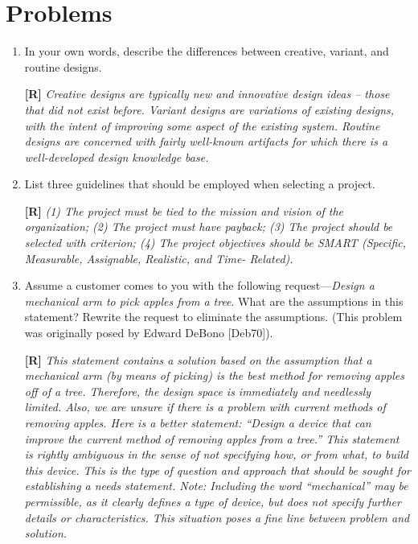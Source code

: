 \section{Problems}
\label{section:projectSelectionProblems}


\begin{enumerate}
\def\labelenumi{\arabic{enumi}.}
\item
  In your own words, describe the differences between creative, variant,
  and routine designs.
 \begin{onlysolution}
 \textbf{[R]}
 \itshape
 Creative designs are typically new and innovative design ideas -- those
that did not exist before. Variant designs are variations of existing
designs, with the intent of improving some aspect of the existing
system. Routine designs are concerned with fairly well-known artifacts
for which there is a well-developed design knowledge base.
  \end{onlysolution}
  
\item
  List three guidelines that should be employed when selecting a
  project.
 \begin{onlysolution}
 \textbf{[R]}
 \itshape
 (1) The project must be tied to the mission and vision of the
organization; (2) The project must have payback; (3) The project should
be selected with criterion; (4) The project objectives should be SMART
(Specific, Measurable, Assignable, Realistic, and Time-
Related).
 \end{onlysolution}
  
  
\item
  Assume a customer comes to you with the following
  request---\emph{Design a mechanical arm to pick apples from a tree}.
  What are the assumptions in this statement? Rewrite the request to
  eliminate the assumptions. (This problem was originally posed by
  Edward DeBono {[}Deb70{]}).

  \begin{onlysolution}
  \textbf{[R]}
  \itshape
  This statement contains a solution based on the assumption that a 
  mechanical arm (by means of picking) is the best method for removing 
  apples off of a tree. Therefore, the design space is immediately and 
  needlessly limited. Also, we are unsure if there is a problem with 
  current methods of removing apples. Here is a better statement:
  \emph{“Design a device that can improve the current method of removing apples from a tree.”}
  This statement is rightly ambiguous in the sense of not specifying 
  how, or from what, to build this device. This is the type of question 
  and approach that should be sought for establishing a needs statement.
  \emph{Note:} Including the word “mechanical” may be permissible, as it 
  clearly defines a type of device, but does not specify further details 
  or characteristics. This situation poses a fine line between problem 
  and solution.
  \end{onlysolution}


\end{enumerate}
